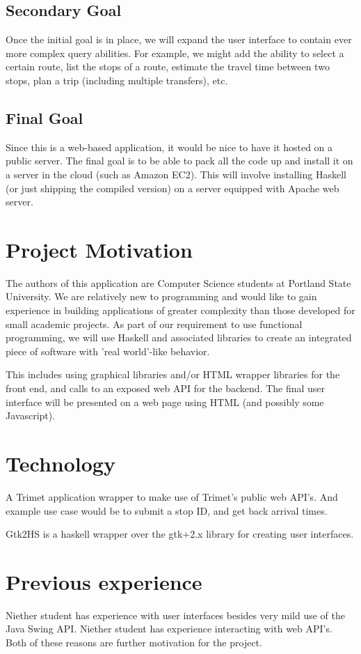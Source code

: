 \documentclass{article}
\begin{document}
\subsection*{Secondary Goal}
Once the initial goal is in place, we will expand the user interface to contain
ever more complex query abilities.  For example, we might add the ability to 
select a certain route, list the stops of a route, estimate the travel time
between two stops, plan a trip (including multiple transfers), etc.

\subsection*{Final Goal}
Since this is a web-based application, it would be nice to have it hosted on
a public server. The final goal is to be able to pack all the code up and 
install it on a server in the cloud (such as Amazon EC2). This will involve
installing Haskell (or just shipping the compiled version) on a server 
equipped with Apache web server.


\section*{Project Motivation} 
The authors of this application are Computer Science students at Portland
State University. We are relatively new to programming and would like to gain
experience in building applications of greater complexity than those developed
for small academic projects. As part of our requirement to use functional
programming, we will use Haskell and associated libraries to create an integrated 
piece of software with 'real world'-like behavior.

This includes using graphical libraries and/or HTML wrapper libraries for the 
front end, and calls to an exposed web API for the backend. The final user
interface will be presented on a web page using HTML (and possibly some Javascript).

\section*{Technology}
A Trimet application wrapper to make use of Trimet's public web API's.
And example use case would be to submit a stop ID, and get back arrival times.

Gtk2HS is a haskell wrapper over the gtk+2.x library for creating user interfaces.

\section*{Previous experience}
Niether student has experience with user interfaces besides very mild use of the Java Swing API.  Niether student has experience interacting with web API's.  Both of these reasons are further motivation for the project.
\end{document}
